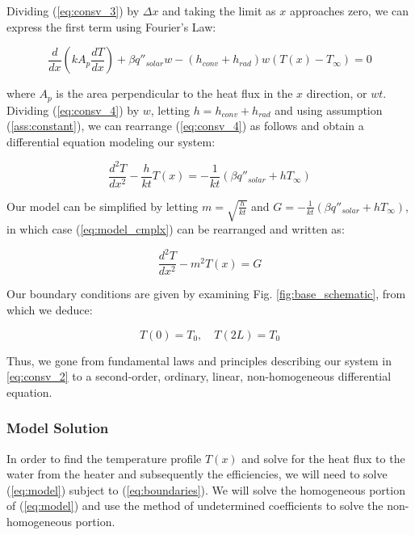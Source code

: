 \documentclass[]{article}
\begin{document}
Dividing (\ref{eq:consv_3}) by $\Delta x$ and taking the limit as $x$ approaches zero, we can express the first term using Fourier's Law:

\begin{equation} \label{eq:consv_4}
	\frac{d}{dx}(kA_p\frac{dT}{dx}) + \beta q''_{solar}w - (h_{conv} + h_{rad})w(T(x) - T_{\infty}) = 0
\end{equation}

where $A_p$ is the area perpendicular to the heat flux in the $x$ direction, or $wt$. Dividing (\ref{eq:consv_4}) by $w$, letting $h = h_{conv} + h_{rad}$ and using assumption (\ref{ass:constant}), we can rearrange (\ref{eq:consv_4}) as follows and obtain a differential equation modeling our system:

\begin{equation} \label{eq:model_cmplx}
	\frac{d^2 T}{dx^2} - \frac{h}{kt}T(x) = -\frac{1}{kt}(\beta q''_{solar} + hT_{\infty})
\end{equation}

Our model can be simplified by letting $m = \sqrt{\frac{h}{kt}}$ and $G = -\frac{1}{kt}(\beta q''_{solar} + hT_{\infty})$, in which case (\ref{eq:model_cmplx}) can be rearranged and written as:

\begin{equation} \label{eq:model}
	\frac{d^2 T}{dx^2} - m^2 T(x) = G
\end{equation}

Our boundary conditions are given by examining Fig. \ref{fig:base_schematic}, from which we deduce:

\begin{equation} \label{eq:boundaries}
T(0) = T_0, \quad T(2L) = T_0
\end{equation}

Thus, we gone from fundamental laws and principles describing our system in \ref{eq:consv_2} to a second-order, ordinary, linear, non-homogeneous differential equation.

\subsubsection{Model Solution}

In order to find the temperature profile $T(x)$ and solve for the heat flux to the water from the heater and subsequently the efficiencies, we will need to solve (\ref{eq:model}) subject to (\ref{eq:boundaries}). We will solve the homogeneous portion of (\ref{eq:model}) and use the method of undetermined coefficients to solve the non-homogeneous portion.
\end{document}
